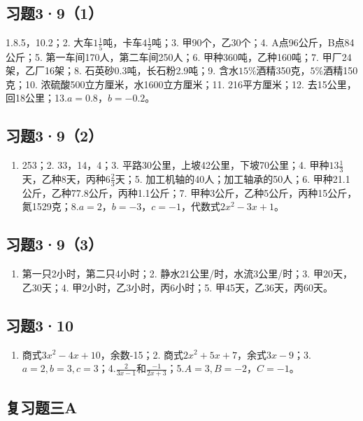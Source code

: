 \subsection{习题3·9（1）}

1.8.5，10.2；2. 大车\(1\frac{1}{5}\)吨，卡车\(4\frac{1}{2}\)吨；3.
甲90个，乙30个；4. A点96公斤，B点84公斤；5.
第一车间170人，第二车间250人；6. 甲种360吨，乙种160吨；7.
甲厂24架，乙厂16架；8. 石英砂0.3吨，长石粉2.9吨；9.
含水\(15\%\)酒精350克，\(5\%\)酒精150克；10.
浓硫酸500立方厘米，水1600立方厘米；11. 216平方厘米；12.
去15公里，回18公里；13.\(a=0.8\)，\(b=-0.2\)。

\subsection{习题3·9（2）}

\begin{enumerate}
\item
  253；2. 33，14，4；3. 平路30公里，上坡42公里，下坡70公里；4.
  甲种\(13\frac{1}{3}\)天，乙种8天，丙种\(6\frac{2}{3}\)天；5.
  加工机轴的40人；加工轴承的50人；6.
  甲种21.1公斤，乙种77.8公斤，丙种1.1公斤；7.
  甲种3公斤，乙种5公斤，丙种15公斤，氮1529克；8.\(a=2\)，\(b=-3\)，\(c=-1\)，代数式\(2x^{2}-3x+1\)。
\end{enumerate}

\subsection{习题3·9（3）}

\begin{enumerate}
\item
  第一只2小时，第二只4小时；2. 静水21公里/时，水流3公里/时；3.
  甲20天，乙30天；4. 甲2小时，乙3小时，丙6小时；5.
  甲45天，乙36天，丙60天。
\end{enumerate}

\subsection{习题3·10}

\begin{enumerate}
\item
  商式\(3x^{2} - 4x + 10\)，余数-15；2.
  商式\(2x^{2} + 5x + 7\)，余式\(3x - 9\)；3.\(a = 2, b = 3, c = 3\)；4.\(\frac{2}{3x - 1}\)和\(\frac{-1}{2x + 3}\)；5.\(A = 3, B = -2\)，\(C = -1\)。
\end{enumerate}

\subsection{复习题三A}

